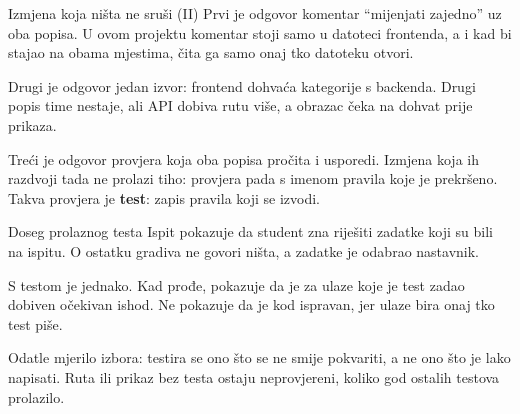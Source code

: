 \begin{frame}{Izmjena koja ništa ne sruši (II)}
Prvi je odgovor komentar \enquote{mijenjati zajedno} uz oba popisa. U ovom projektu komentar stoji samo u datoteci frontenda, a i kad bi stajao na obama mjestima, čita ga samo onaj tko datoteku otvori.

\vspace{0.9em}
Drugi je odgovor jedan izvor: frontend dohvaća kategorije s backenda. Drugi popis time nestaje, ali API dobiva rutu više, a obrazac čeka na dohvat prije prikaza.

\vspace{0.9em}
Treći je odgovor provjera koja oba popisa pročita i usporedi. Izmjena koja ih razdvoji tada ne prolazi tiho: provjera pada s imenom pravila koje je prekršeno. Takva provjera je \textbf{test}: zapis pravila koji se izvodi.
\end{frame}


\begin{frame}{Doseg prolaznog testa}
Ispit pokazuje da student zna riješiti zadatke koji su bili na ispitu. O ostatku gradiva ne govori ništa, a zadatke je odabrao nastavnik.

\vspace{0.9em}
S testom je jednako. Kad prođe, pokazuje da je za ulaze koje je test zadao dobiven očekivan ishod. Ne pokazuje da je kod ispravan, jer ulaze bira onaj tko test piše.

\vspace{0.9em}
Odatle mjerilo izbora: testira se ono što se ne smije pokvariti, a ne ono što je lako napisati. Ruta ili prikaz bez testa ostaju neprovjereni, koliko god ostalih testova prolazilo.
\end{frame}

